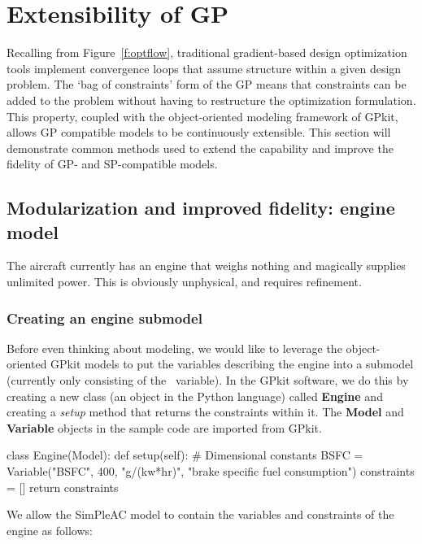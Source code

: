 \chapter{Extensibility of GP}
\label{ch3:extensibility}

Recalling from Figure~\ref{f:optflow}, traditional gradient-based design optimization tools implement
convergence loops that assume structure within a given design problem.
The `bag of constraints' form of the GP means that constraints can be
added to the problem without
having to restructure the optimization formulation. This property,
coupled with the object-oriented modeling framework of GPkit, allows
\gls{GP} compatible models to be continuously extensible.
This section will demonstrate common methods used to extend the capability
and improve the fidelity of \gls{GP}- and \gls{SP}-compatible models.

\section{Modularization and improved fidelity: engine model}
\label{s:engine}

The aircraft currently has an engine that weighs nothing and magically supplies
unlimited power. This is obviously unphysical, and requires refinement.

\subsection{Creating an engine submodel}

Before even thinking about modeling, we would like to leverage the object-oriented
GPkit models to put the variables describing the engine into a submodel (currently only
consisting of the \BSFC~variable).
In the GPkit software, we do this by creating a new class (an object in the Python language)
called \textbf{Engine} and creating a \textit{setup}
method that returns the constraints within it. The \textbf{Model} and \textbf{Variable}
objects in the sample code
are imported from GPkit.

\begin{python}
    class Engine(Model):
        def setup(self):
            # Dimensional constants
            BSFC = Variable("BSFC", 400, "g/(kw*hr)",
                                    "brake specific fuel consumption")
            constraints = []
            return constraints
\end{python}

We allow the SimPleAC model to contain the variables and constraints of the engine
as follows:


